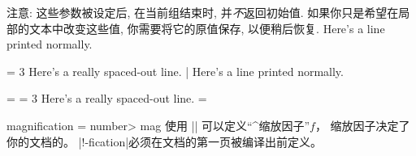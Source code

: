 注意:
这些参数被设定后, 在当前组结束时, 并\emph{不}返回初始值.
如果你只是希望在局部的文本中改变这些值,
你需要将它的原值保存, 以便稍后恢复.
\example
Here's a line printed normally.\par
{}\font = 3\font
\noindent Here's a really spaced-out line.
|
\produces
Here's a line printed normally.\par
{} = \font %
\font = 3\font
\noindent Here's a really spaced-out line.
\font = 
\endexample
\enddesc

\begindesc
\cts magnification {{\bt =} \<number>}
\cts mag {}
\explain
{}
使用 |\magnification| 可以定义“^{缩放因子}”$f$，
缩放因子决定了你的文档的。
|\magni!-fication|必须在文档的第一页被编译出前定义。

